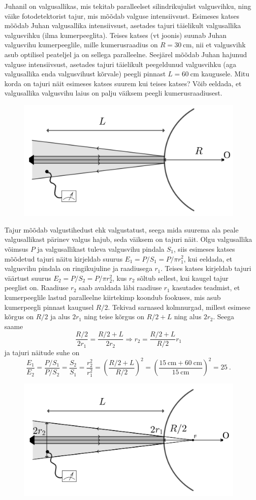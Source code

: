 
Juhanil on valgusallikas, mis tekitab paralleelset silindrikujulist valgusvihku, ning väike fotodetektorist tajur, mis mõõdab valguse intensiivsust. Esimeses katses mõõdab Juhan valgusallika intensiivsust, asetades tajuri täielikult valgusallika valgusvihku (ilma kumerpeeglita). Teises katses (vt joonis) suunab Juhan valgusvihu kumerpeeglile, mille kumerusraadius on $R=\SI{30}{\centi\m}$, nii et valgusvihk asub optilisel peateljel ja on sellega paralleelne. Seejärel mõõdab Juhan hajunud valguse intensiivsust, asetades tajuri täielikult peegeldunud valgusvihku (aga valgusallika enda valgusvihust kõrvale) peegli pinnast $L=\SI{60}{\centi\m}$ kaugusele. Mitu korda on tajuri näit esimeses katses suurem kui teises katses? Võib eeldada, et valgusallika valgusvihu laius on palju väiksem peegli kumerusraadiusest.

\begin{figure}[h]
    \centering
    \includegraphics[width=0.6\linewidth]{2024-v2g-02-yl.png}
\end{figure}




\hint

\solu
Tajur mõõdab valgustihedust ehk valgustatust, seega mida suurema ala peale valgusallikast pärinev valgus hajub, seda väiksem on tajuri näit. Olgu valgusallika võimsus $P$ ja valgusallikast tuleva valgusvihu pindala $S_1$, siis esimeses katses mõõdetud tajuri näitu kirjeldab suurus $E_1 = P/S_1 = P/\pi r_1^2$, kui eeldada, et valgusvihu pindala on ringikujuline ja raadiusega $r_1$. Teises katses kirjeldab tajuri väärtust suurus $E_2 = P/S_2 = P/\pi r_2^2$, kus $r_2$ sõltub sellest, kui kaugel tajur peeglist on. Raadiuse $r_2$ saab avaldada läbi raadiuse $r_1$ kasutades teadmist, et kumerpeeglile lastud paralleelne kiirtekimp koondub fookuses, mis asub kumerpeegli pinnast kaugusel $R/2$. Tekivad sarnased kolmnurgad, millest esimese kõrgus on $R/2$ ja alus $2r_1$ ning teise kõrgus on $R/2 + L$ ning alus $2r_2$. Seega saame
$$ \frac{R/2}{2r_1} = \frac{R/2 + L}{2r_2} \Rightarrow r_2 = \frac{R/2 + L}{R/2} r_1$$
ja tajuri näitude suhe on
$$ \frac{E_1}{E_2} = \frac{P/S_1}{P/S_2} = \frac{S_2}{S_1} = \frac{r_2^2}{r_1^2} = \left(\frac{R/2 + L}{R/2}\right)^2 = \left(\frac{\SI{15}{\centi\meter} + \SI{60}{\centi\meter}}{\SI{15}{\centi\meter}}\right)^2 = 25 \ .$$

\begin{figure}[h]
    \centering
    \includegraphics[width=0.6\linewidth]{2024-v2g-02-sol.png}
\end{figure}
\probend